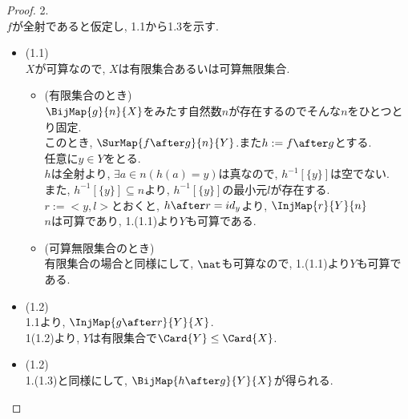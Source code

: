 \begin{proof} 2. \\
  $f$が全射であると仮定し,
  1.1から1.3を示す.\\
  \begin{itemize}
    \item[]\hspace{-0.5cm} (1.1) \\
      $X$が可算なので,
      $X$は有限集合あるいは可算無限集合.\\
    \begin{itemize}
     \item[]\hspace{-0.5cm} (有限集合のとき) \\
       $\BijMap{g}{n}{X}$をみたす自然数$n$が存在するのでそんな$n$をひとつとり固定.\\
       このとき,
       $\SurMap{f \after g}{n}{Y}$.また$h:=f \after g$とする.\\
       任意に$y \in Y$をとる.\\
       $h$は全射より,
       $\exists a \in n(h(a) = y)$は真なので,
       $h^{-1}[\{y\}]$は空でない.\\
       また,
       $h^{-1}[\{y\}] \subseteq n$より,
       $h^{-1}[\{y\}]$の最小元$l$が存在する.\\
       $r:=<y, l>$とおくと,
       $h \after r = id_y$より,
       $\InjMap{r}{Y}{n}$\\
       $n$は可算であり,
       1.(1.1)より$Y$も可算である.
     \item[]\hspace{-0.5cm} (可算無限集合のとき) \\
       有限集合の場合と同様にして,
       $\nat$も可算なので,
       1.(1.1)より$Y$も可算である.
    \end{itemize}
    \item[]\hspace{-0.5cm} (1.2) \\
      1.1より,
      $\InjMap{g \after r}{Y}{X}$.\\
      1(1.2)より,
      $Y$は有限集合で$\Card{Y} \leq \Card{X}$.
    \item[]\hspace{-0.5cm} (1.2) \\
      1.(1.3)と同様にして,
      $\BijMap{h \after g}{Y}{X}$が得られる.\\
  \end{itemize}
\end{proof}
